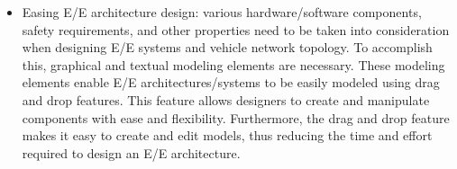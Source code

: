 \begin{itemize}
    \item Easing E/E architecture design: %
    various hardware/software components, safety requirements, and other properties need to be taken into consideration when designing E/E systems and vehicle network topology. To accomplish this, graphical and textual modeling elements are necessary. These modeling elements enable E/E architectures/systems to be easily modeled using drag and drop features. This feature allows designers to create and manipulate components with ease and flexibility. Furthermore, the drag and drop feature makes it easy to create and edit models, thus reducing the time and effort required to design an E/E architecture.
    
    
    

\end{itemize}
